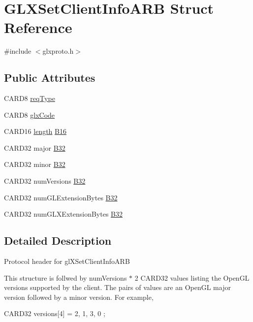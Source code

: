 \hypertarget{struct_g_l_x_set_client_info_a_r_b}{}\section{G\+L\+X\+Set\+Client\+Info\+A\+RB Struct Reference}
\label{struct_g_l_x_set_client_info_a_r_b}


{\ttfamily \#include $<$glxproto.\+h$>$}

\subsection*{Public Attributes}
\begin{DoxyCompactItemize}
\item 
C\+A\+R\+D8 \hyperlink{struct_g_l_x_set_client_info_a_r_b_a94378cab3843458bb1c5f99af3c17780}{req\+Type}
\item 
C\+A\+R\+D8 \hyperlink{struct_g_l_x_set_client_info_a_r_b_a072606df08ddfe8d19dcb787fed4c569}{glx\+Code}
\item 
C\+A\+R\+D16 \hyperlink{glcorearb_8h_ab9c919755bde3b34349e23a32b4e0fa7}{length} \hyperlink{struct_g_l_x_set_client_info_a_r_b_a5a7a613b3975dfeff7e06bba4bab76fd}{B16}
\item 
C\+A\+R\+D32 major \hyperlink{struct_g_l_x_set_client_info_a_r_b_ae2bf01e003c062f6f0f36a462f544427}{B32}
\item 
C\+A\+R\+D32 minor \hyperlink{struct_g_l_x_set_client_info_a_r_b_af218a2047f0e77643c761cdd5d168ba4}{B32}
\item 
C\+A\+R\+D32 num\+Versions \hyperlink{struct_g_l_x_set_client_info_a_r_b_ae083499c3f35dbb98509585e7982c6d9}{B32}
\item 
C\+A\+R\+D32 num\+G\+L\+Extension\+Bytes \hyperlink{struct_g_l_x_set_client_info_a_r_b_a48c0050bf8e4c76d9b3e6f7ac372500b}{B32}
\item 
C\+A\+R\+D32 num\+G\+L\+X\+Extension\+Bytes \hyperlink{struct_g_l_x_set_client_info_a_r_b_accdd7c71da4ef3d8069da4310b1a9fa3}{B32}
\end{DoxyCompactItemize}


\subsection{Detailed Description}
Protocol header for gl\+X\+Set\+Client\+Info\+A\+RB

This structure is follwed by {\ttfamily num\+Versions} $\ast$ 2 {\ttfamily C\+A\+R\+D32} values listing the Open\+GL versions supported by the client. The pairs of values are an Open\+GL major version followed by a minor version. For example, \begin{DoxyVerb} CARD32 versions[4] = { 2, 1, 3, 0 };
\end{DoxyVerb}


